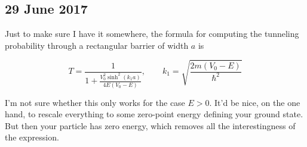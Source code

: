\documentclass[]{report}
\begin{document}
\subsection*{29 June 2017}

Just to make sure I have it somewhere, the formula for computing the tunneling probability through a rectangular barrier of width $a$ is

\begin{equation}
T = \frac{1}{1+\frac{V_0^2\sinh^2(k_1a)}{4E(V_0-E)}}, \qquad k_1 = \sqrt{\frac{2m(V_0-E)}{\hbar^2}}
\end{equation}

I'm not sure whether this only works for the case $E>0$. It'd be nice, on the one hand, to rescale everything to some zero-point energy defining your ground state. But then your particle has zero energy, which removes all the interestingness of the expression.
\end{document}
